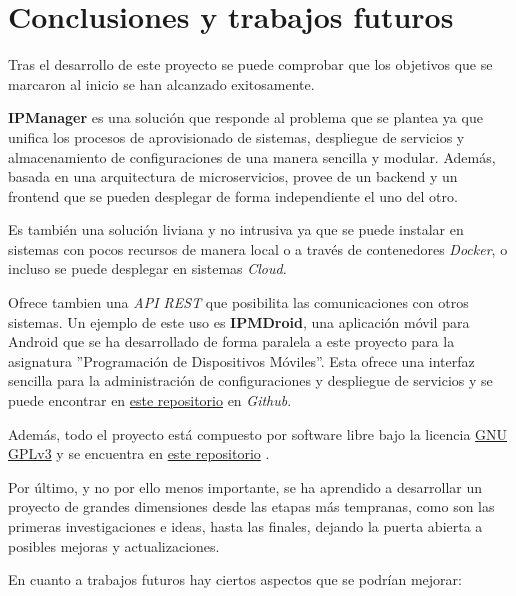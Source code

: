 \chapter{Conclusiones y trabajos futuros}

Tras el desarrollo de este proyecto se puede comprobar que los objetivos que se marcaron al inicio se han alcanzado exitosamente.

\textbf{IPManager} es una solución que responde al problema que se plantea ya que unifica los procesos de aprovisionado de sistemas, despliegue de servicios y almacenamiento de configuraciones de una manera sencilla y modular. Además, basada en una arquitectura de microservicios, provee de un backend y un frontend que se pueden desplegar de forma independiente el uno del otro.

Es también una solución liviana y no intrusiva ya que se puede instalar en sistemas con pocos recursos de manera local o a través de contenedores \textit{Docker}, o incluso se puede desplegar en sistemas \textit{Cloud}.

Ofrece tambien una \textit{API REST} que posibilita las comunicaciones con otros sistemas. Un ejemplo de este uso es \textbf{IPMDroid}, una aplicación móvil para Android que se ha desarrollado de forma paralela a este proyecto para la asignatura ''Programación de Dispositivos Móviles''. Esta ofrece una interfaz sencilla para la administración de configuraciones y despliegue de servicios y se puede encontrar en \href{https://github.com/harvestcore/ipmdroid}{este repositorio} \cite{ipmdroid} en \textit{Github}.

Además, todo el proyecto está compuesto por software libre bajo la licencia \href{https://www.gnu.org/licenses/gpl-3.0.html}{GNU GPLv3} y se encuentra en \href{https://github.com/harvestcore/tfg}{este repositorio} \cite{ipmanager}.

Por último, y no por ello menos importante, se ha aprendido a desarrollar un proyecto de grandes dimensiones desde las etapas más tempranas, como son las primeras investigaciones e ideas, hasta las finales, dejando la puerta abierta a posibles mejoras y actualizaciones.


\pagebreak
En cuanto a trabajos futuros hay ciertos aspectos que se podrían mejorar:

